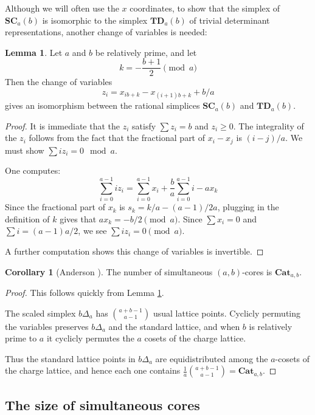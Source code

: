 \documentclass{amsart}[12pt]
\theoremstyle{definition}
\newtheorem{lemma}[dummy]{Lemma}
\newtheorem{corollary}[dummy]{Corollary}
\newcommand{\SC}{\mathbf{SC}}
\newcommand{\TD}{\mathbf{TD}}
\newcommand{\Cat}{\mathbf{Cat}}
\begin{document}
Although we will often use the $x$ coordinates, to show that the simplex of $\SC_a(b)$ is isomorphic to the simplex $\TD_a(b)$ of trivial determinant representations, another change of variables is needed:
 
\begin{lemma} \label{lem:standardsimplex}
Let $a$ and $b$ be relatively prime, and let 
$$k=-\frac{b+1}{2}\pmod a$$
  Then the change of variables
$$z_i=x_{ib+k}-x_{(i+1)b+k}+b/a$$
gives an isomorphism between the rational simplices $\SC_a(b)$ and $\TD_a(b)$. 
\end{lemma}

\begin{proof}
It is immediate that the $z_i$ satisfy $\sum z_i=b$ and $z_i\geq 0$.  The integrality of the $z_i$ follows from the fact that the fractional part of $x_i-x_j$ is $(i-j)/a$.  We must show $\sum iz_i=0\mod a$.

One computes:
$$\sum_{i=0}^{a-1} iz_i=\sum_{i=0}^{a-1} x_i+\frac{b}{a}\sum_{i=0}^{a-1} i -ax_k$$
Since the fractional part of $x_k$ is $s_k=k/a-(a-1)/2a$, plugging in the definition of $k$ gives that $ax_k=-b/2\pmod a$.  Since $\sum x_i=0$ and $\sum i=(a-1)a/2$, we see $\sum iz_i=0\pmod a$.

A further computation shows this change of variables is invertible.
\end{proof}


\begin{corollary}[Anderson \cite{anderson}] \label{cor:anderson} The number of simultaneous $(a,b)$-cores is $\Cat_{a,b}$.
\end{corollary}

\begin{proof} This follows quickly from Lemma \ref{lem:standardsimplex}.


The scaled simplex $b\Delta_a$ has $\binom{a+b-1}{a-1}$
  usual lattice points.  Cyclicly permuting the variables preserves
  $b\Delta_a$ and the standard lattice, and when $b$ is relatively prime to $a$ it cyclicly permutes the $a$ cosets of the charge lattice.   

Thus the standard lattice points in
  $b\Delta_a$ are equidistributed among the $a$-cosets of the
  charge lattice, and hence each one contains $\frac{1}{a}\binom{a+b-1}{a-1}=\Cat_{a,b}$.


\end{proof}

\subsection{The size of simultaneous cores}
\end{document}
